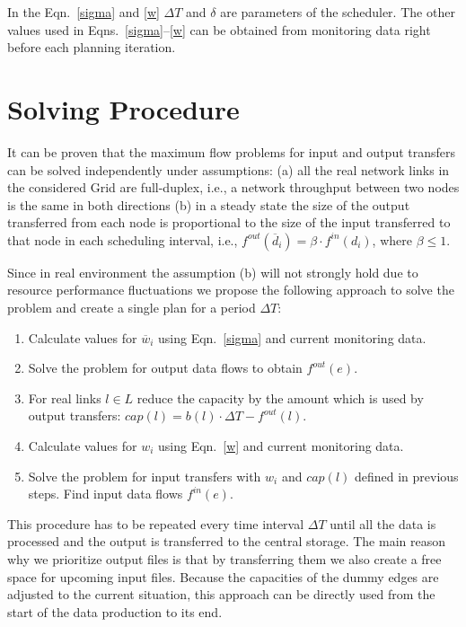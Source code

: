 \documentclass{svjour3}                     %
\begin{document}
%

In the Eqn.~\ref{sigma} and \ref{w} $\Delta T$ and $\delta$ are parameters of the scheduler. The other values used in
Eqns.~\ref{sigma}--\ref{w} can be obtained from monitoring data right before each planning iteration.

\section{Solving Procedure}
\label{solve}
It can be proven that the maximum flow problems for input and output transfers
can be solved independently under assumptions: (a) all the real network links
in the considered Grid are full-duplex, i.e., a network throughput between two
nodes is the same in both directions (b) in a steady state the size of the
output transferred from each node is proportional to the size of the input
transferred to that node in each scheduling interval, i.e.,
$f^{out}(\overline{d}_{i})= \beta \cdot f^{in}(d_{i})$, where $\beta \leq 1$.

Since in real environment the assumption (b) will not strongly hold due to
resource performance fluctuations we propose the following approach to
solve the problem and create a single plan for a period $\Delta T$:
%
\begin{enumerate}
\item Calculate values for $\overline{w}_{i}$ using Eqn.~\ref{sigma} and current monitoring data.
\item Solve the problem for output data flows to obtain $f^{out}(e)$.
\item For real links $l \in L$ reduce the capacity by the amount which is used by output transfers: $cap(l) = b(l) \cdot \Delta T - f^{out}(l)$.
\item Calculate values for $w_{i}$ using Eqn.~\ref{w} and current monitoring data.
\item Solve the problem for input transfers with $w_{i}$ and $cap(l)$ defined in previous steps. Find input data flows $f^{in}(e)$.
\end{enumerate}
%
This procedure has to be repeated every time interval $\Delta T$ until all the data is processed and the output is transferred to the central storage. The main reason why we prioritize output files is that by transferring them we also create a free space for upcoming input files. Because the capacities of the dummy edges are adjusted to the current situation, this approach can be directly used from the start of the data production to its end.
\end{document}
